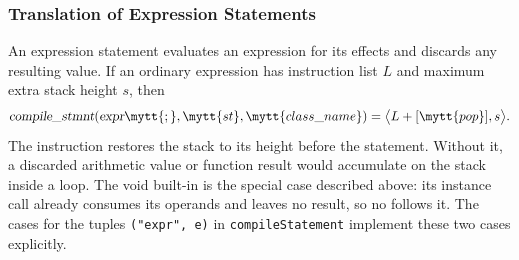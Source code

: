 \subsubsection{Translation of Expression Statements} An expression statement evaluates an expression for its effects and discards any resulting value.
If an ordinary expression has instruction list $L$ and maximum extra stack height $s$, then \[ \textsl{compile\_stmnt}(\textsl{expr}\mytt{;},\mytt{st},\mytt{class\_name}) =\bigl\langle L+[\mytt{pop}],s\bigr\rangle.
\] The  instruction restores the stack to its height before the statement.
Without it, a discarded arithmetic value or function result would accumulate on the stack inside a loop.
The void built-in  is the special case described above: its instance call already consumes its operands and leaves no result, so no  follows it.
The cases for the tuples \texttt{("expr", e)} in \texttt{compileStatement} implement these two cases explicitly.
